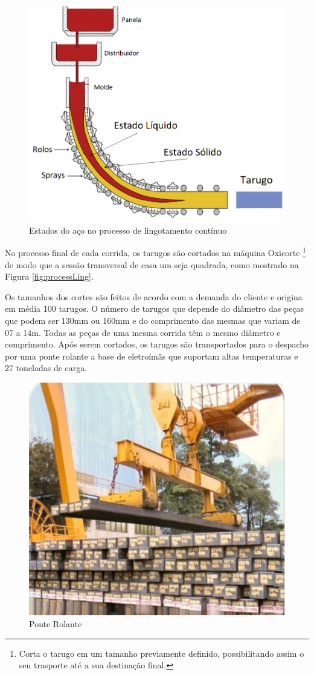 \begin{figure}[hbt!]
	\centering
	\includegraphics[width=0.8\linewidth]{figuras/Steel/estadoSolidoLiq.png}
	\caption{Estados do aço no processo de lingotamento contínuo}
	\label{fig:processLingSolid}
\end{figure}

No processo final de cada corrida, os tarugos são cortados na máquina Oxicorte \footnote{Corta o tarugo em um tamanho previamente definido, possibilitando assim o seu trasporte até a sua destinação final.} de modo que a sessão transversal de casa um seja quadrada, como mostrado na Figura \ref{fig:processLing}.  

Os tamanhos dos cortes são feitos de acordo com a demanda do cliente e origina em média 100 tarugos. O número de tarugos que depende do diâmetro das peças que podem ser 130mm ou 160mm e do comprimento das mesmas que variam de 07 a 14m. Todas as peças de uma mesma corrida têm o mesmo diâmetro e comprimento. Após serem cortados, os tarugos são transportados para o despacho por uma ponte rolante a base de eletroímãs que suportam altas temperaturas e $27$ toneladas de carga. 


\begin{figure}[htbp]
	\centering
	\includegraphics[width=0.7\linewidth]{figuras/Steel/ponte_rolante.png}
	\caption{Ponte Rolante}
	\label{fig:crane}
\end{figure}

